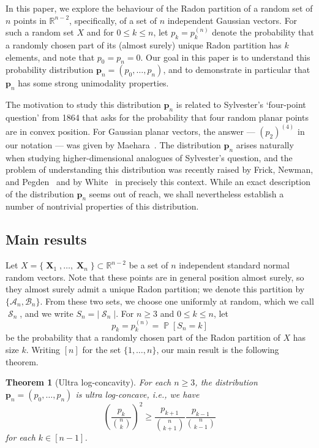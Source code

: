 \documentclass[12pt,english,reqno]{amsart}
\theoremstyle{plain}
\newtheorem{thm}{Theorem}[section]
\theoremstyle{remark}
\numberwithin{figure}{section}
\numberwithin{equation}{section}
\def\rr{\mathbb{R}}
\def\cA{\mathcal{A}} %
\def\cB{\mathcal{B}} %
\DeclareMathOperator{\Pb}{\mathbb{P}} %
\DeclareMathOperator{\cS}{\mathcal{S}} %
\DeclareMathOperator{\Xb}{\mathbf{X}} %
\def\ap{p} %
\begin{document}
In this paper, we explore the behaviour of the Radon partition of a random set of $n$ points in $\rr^{n-2}$, specifically, of a set of $n$ independent Gaussian vectors. For such a random set $X$ and for $0 \le k \le n$, let $p_k = p_k^{(n)}$ denote the probability that a randomly chosen part of its (almost surely) unique Radon partition has $k$ elements, and note that $p_0=p_n=0$. Our goal in this paper is to understand this probability distribution $\mathbf{p}_n = (p_0,\dots, p_n)$, and to demonstrate in particular that $\mathbf{p}_n$ has some strong unimodality properties.

The motivation to study this distribution $\mathbf{p}_n$ is related to Sylvester's `four-point question' from 1864 that asks for the probability that four random planar points are in convex position. For Gaussian planar vectors, the answer --- $(p_2)^{(4)}$ in our notation --- was given by Maehara~\citep{Mae78}. The distribution $\mathbf{p}_n$ arises naturally when studying higher-dimensional analogues of Sylvester's question, and the problem of understanding this distribution was recently raised by Frick, Newman, and Pegden~\citep{FNP25} and by White~\citep{White} in precisely this context. While an exact description of the distribution $\mathbf{p}_n$ seems out of reach, we shall nevertheless establish a number of nontrivial properties of this distribution.

\subsection*{Main results}
Let $X = \{\Xb_1,\dots, \Xb_{n}\} \subset \rr^{n-2}$ be a set of $n$ independent standard normal random vectors. Note that these points are in general position almost surely, so they almost surely admit a unique Radon partition; we denote this partition by $\{\cA_n,\cB_n\}$. From these two sets, we choose one uniformly at random, which we call $\cS_n$, and we write $S_n=|\cS_n|$. For $n \geq 3$ and $0 \le k \le n$, let
\begin{equation}\label{eq:p_k}
	\ap_k = \ap_k^{(n)} = \Pb[S_n=k]
\end{equation}
be the probability that a randomly chosen part of the Radon partition of $X$ has size $k$. Writing $[n]$ for the set $\{1,\dots,n\}$, our main result is the following theorem.

\begin{thm}[Ultra log-concavity]\label{thm:ULC}
	For each $n \geq 3$, the distribution $\mathbf{p}_n = (p_0,\dots, p_n)$ is ultra log-concave, i.e., we have
	\[
		\left( \frac{\ap_{k}}{\binom{n}{k}} \right)^{2} \geq \frac{\ap_{k+1}}{\binom{n}{k+1}} \frac{\ap_{k-1}}{\binom{n}{k-1}}
	\]
	for each $k \in [n-1]$.
\end{thm}
\end{document}
